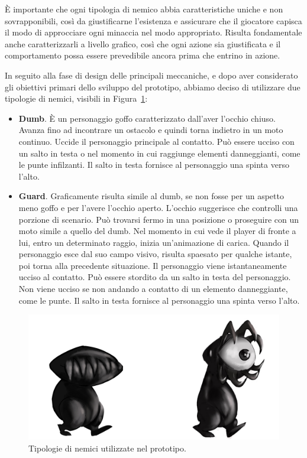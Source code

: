 È importante che ogni tipologia di nemico abbia caratteristiche uniche e non sovrapponibili, così da giustificarne l’esistenza e assicurare che il giocatore capisca il modo di approcciare ogni minaccia nel modo appropriato. Risulta fondamentale anche caratterizzarli a livello grafico, così che ogni azione sia giustificata e il comportamento possa essere prevedibile ancora prima che entrino in azione.

In seguito alla fase di design delle principali meccaniche, e dopo aver considerato gli obiettivi primari dello sviluppo del prototipo, abbiamo deciso di utilizzare due tipologie di nemici, visibili in Figura~\ref{fig:ambientazione_nemico_03}:

\begin{itemize}
	\item \textbf{Dumb}. \label{dumb} È un personaggio goffo caratterizzato dall’aver l’occhio chiuso. Avanza fino ad incontrare un ostacolo e quindi torna indietro in un moto continuo. Uccide il personaggio principale al contatto. Può essere ucciso con un salto in testa o nel momento in cui raggiunge elementi danneggianti, come le punte infilzanti. Il salto in testa fornisce al personaggio una spinta verso l’alto.
	\item \textbf{Guard}. \label{guard} Graficamente risulta simile al dumb, se non fosse per un aspetto meno goffo e per l’avere l’occhio aperto. L’occhio suggerisce che controlli una porzione di scenario. Può trovarsi fermo in una posizione o proseguire con un moto simile a quello del dumb. Nel momento in cui vede il player di fronte a lui, entro un determinato raggio, inizia un’animazione di carica. Quando il personaggio esce dal suo campo visivo, risulta spaesato per qualche istante, poi torna alla precedente situazione. Il personaggio viene istantaneamente ucciso al contatto. Può essere stordito da un salto in testa del personaggio. Non viene ucciso se non andando a contatto di un elemento danneggiante, come le punte. Il salto in testa fornisce al personaggio una spinta verso l’alto.
\end{itemize}

\begin{figure}%
	\centering
	\includegraphics[width= 0.8\columnwidth]{images/gameDesign/35_nemici.jpg}
	\caption{Tipologie di nemici utilizzate nel prototipo.}
	\label{fig:ambientazione_nemico_03}
\end{figure}

